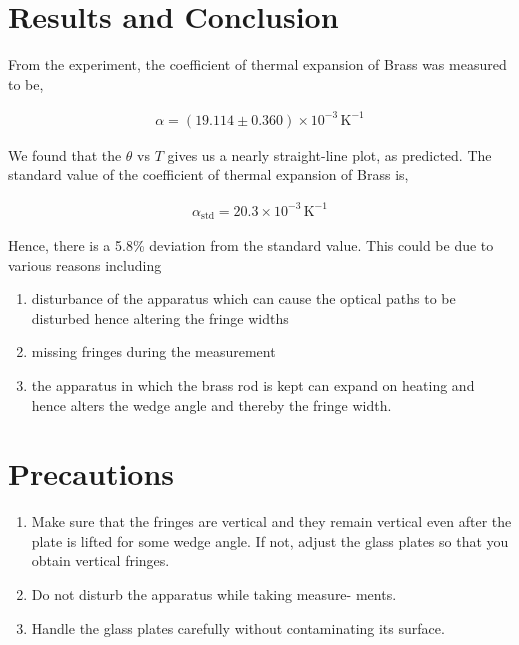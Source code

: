 \section{Results and Conclusion}

From the experiment, the coefficient of thermal expansion of Brass was measured to be,

\begin{align*}
    \alpha = (19.114 \pm 0.360) \times 10^{-3}\,\text{K}^{-1}
\end{align*}

We found that the $\theta$ vs $T$ gives us a nearly straight-line
plot, as predicted. The standard value of the coefficient of thermal expansion of Brass is,

\begin{align*}
    \alpha_\text{std} = 20.3 \times 10^{-3}\,\text{K}^{-1}
\end{align*}

Hence, there is a 5.8\% deviation from the standard value. This could be due to various reasons including 

\begin{enumerate}[label=(\roman*)]
    \item disturbance of the apparatus which can cause the
    optical paths to be disturbed hence altering the
    fringe widths
    \item missing fringes during the measurement
    \item the apparatus in which the brass rod is kept can
    expand on heating and hence alters the wedge angle
    and thereby the fringe width.
\end{enumerate}

\section{Precautions}

\begin{enumerate}
    \item Make sure that the fringes are vertical and they remain
    vertical even after the plate is lifted for some wedge angle.
    If not, adjust the glass plates so that you obtain
    vertical fringes.
    \item Do not disturb the apparatus while taking measure-
    ments.
    \item Handle the glass plates carefully without contaminating
    its surface.
\end{enumerate}